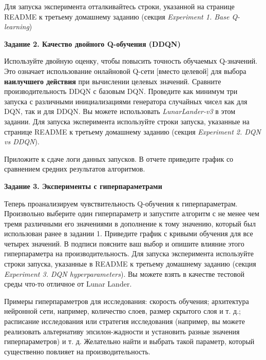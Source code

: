\documentclass[12pt, oneside]{article}
\begin{document}
Для запуска эксперимента отталкивайтесь строки, указанной на странице README к третьему домашнему заданию (секция \textit{Experiment 1. Base Q-learning})

\textbf{Задание 2. Качество двойного Q-обучения (DDQN)}

Используйте двойную оценку, чтобы повысить точность обучаемых Q-значений. Это означает использование онлайновой Q-сети [вместо целевой] для выбора \textbf{наилучшего действия} при вычислении целевых значений. Сравните производительность DDQN с базовым DQN. Проведите как минимум три запуска с различными инициализациями генератора случайных чисел как для DQN, так и для DDQN. Вы можете использовать \textit{LunarLander-v3} в этом задании. Для запуска эксперимента используйте строки запуска, указанные на странице README к третьему домашнему заданию (секция \textit{Experiment 2. DQN vs DDQN}).

Приложите к сдаче логи данных запусков. В отчете приведите график со сравнением средних результатов алгоритмов.

\textbf{Задание 3. Эксперименты с гиперпараметрами}

Теперь проанализируем чувствительность Q-обучения к гиперпараметрам. Произвольно выберите один гиперпараметр и запустите алгоритм с не менее чем тремя различными его значениями в дополнение к тому значению, который был использован ранее в задании 1. Приведите график с кривыми обучения для все четырех значений. В подписи поясните ваш выбор и опишите влияние этого гиперпараметра на производительность. Для запуска эксперимента используйте строки запуска, указанные в README к третьему домашнему заданию (секция \textit{Experiment 3. DQN hyperparameters}). Вы можете взять в качестве тестовой среды что-то отличное от Lunar Lander.

Примеры гиперпараметров для исследования: скорость обучения; архитектура нейронной сети, например, количество слоев, размер скрытого слоя и т. д.; расписание исследования или стратегия исследования (например, вы можете реализовать альтернативу эпсилон-жадности и установить разные значения гиперпараметров) и т. д. Желательно найти и выбрать такой параметр, который существенно повлияет на производительность.
\end{document}
